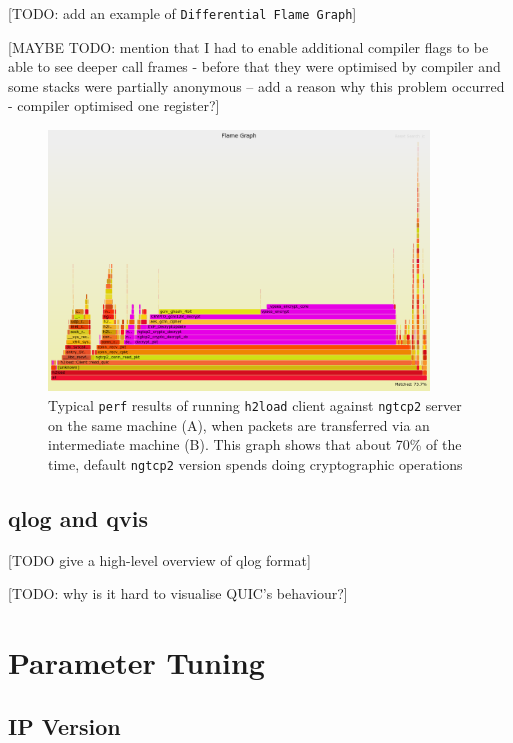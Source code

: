 \documentclass[12pt,a4paper,twoside,openright]{report}
\begin{document}
[TODO: add an example of \texttt{Differential Flame Graph}]





[MAYBE TODO: mention that I had to enable additional compiler flags to be able to see deeper call frames - before that they were optimised by compiler and some stacks were partially anonymous  -- add a reason why this problem occurred - compiler optimised one register?]

    \begin{figure}[ht]
    \centering
    \includegraphics[width=0.9\textwidth]{figs/perf_results_of_h2load.png}
    \caption{Typical \texttt{perf} results of running \texttt{h2load} client against \texttt{ngtcp2} server on the same machine (A), when packets are transferred via an intermediate machine (B). This graph shows that about 70\% of the time, default \texttt{ngtcp2} version spends doing cryptographic operations} 
    \label{fig:perf_results_of_h2load}
    \end{figure}
    
\subsection{qlog and qvis}
[TODO give a high-level overview of qlog format]

[TODO: why is it hard to visualise QUIC's behaviour?]



\section{Parameter Tuning}

\subsection{IP Version}
\end{document}
